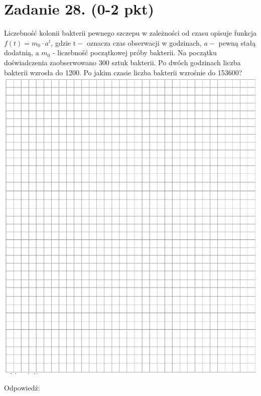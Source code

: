 \documentclass[10pt]{article}
\begin{document}
\section*{Zadanie 28. (0-2 pkt)}
Liczebność kolonii bakterii pewnego szczepu w zależności od czasu opisuje funkcja \(f(t)=m_{0} \cdot a^{t}\), gdzie \(\mathrm{t}-\) oznacza czas obserwacji w godzinach, \(a-\) pewną stałą dodatnią, a \(m_{0}\) - liczebność początkowej próby bakterii. Na początku doświadczenia zaobserwowano 300 sztuk bakterii. Po dwóch godzinach liczba bakterii wzrosła do 1200. Po jakim czasie liczba bakterii wzrośnie do 153600?\\
\includegraphics[max width=\textwidth, center]{2024_11_21_997c30e0b98e62837d84g-13}

Odpowiedź:
\end{document}
